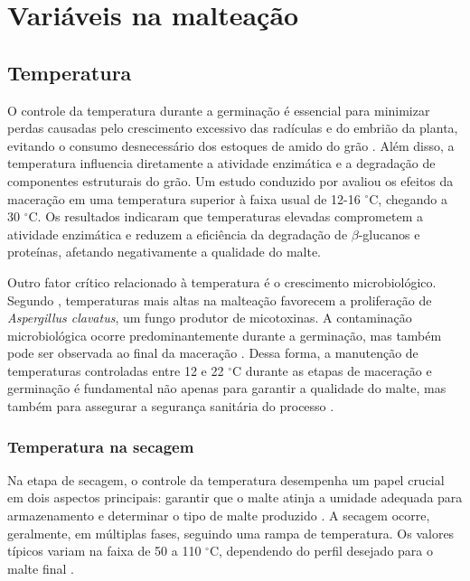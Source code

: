 \section{Variáveis na malteação}

\subsection{Temperatura}

O controle da temperatura durante a germinação é essencial para minimizar perdas causadas pelo crescimento excessivo das radículas e do embrião da planta, evitando o consumo desnecessário dos estoques de amido do grão \cite{PITZ1990, MALLETT2022}. Além disso, a temperatura influencia diretamente a atividade enzimática e a degradação de componentes estruturais do grão. Um estudo conduzido por  avaliou os efeitos da maceração em uma temperatura superior à faixa usual de 12-16 $^{\circ}$C, chegando a 30 $^{\circ}$C. Os resultados indicaram que temperaturas elevadas comprometem a atividade enzimática e reduzem a eficiência da degradação de $\beta$-glucanos e proteínas, afetando negativamente a qualidade do malte.

Outro fator crítico relacionado à temperatura é o crescimento microbiológico. Segundo , temperaturas mais altas na malteação favorecem a proliferação de \textit{Aspergillus clavatus}, um fungo produtor de micotoxinas. A contaminação microbiológica ocorre predominantemente durante a germinação, mas também pode ser observada ao final da maceração \cite{PETTERS1988}. Dessa forma, a manutenção de temperaturas controladas entre 12 e 22 $^{\circ}$C durante as etapas de maceração e germinação é fundamental não apenas para garantir a qualidade do malte, mas também para assegurar a segurança sanitária do processo \cite{TANGNI2002}.

\subsubsection{Temperatura na secagem}

Na etapa de secagem, o controle da temperatura desempenha um papel crucial em dois aspectos principais: garantir que o malte atinja a umidade adequada para armazenamento e determinar o tipo de malte produzido \cite{KUNZE1996}. A secagem ocorre, geralmente, em múltiplas fases, seguindo uma rampa de temperatura. Os valores típicos variam na faixa de 50 a 110 $^{\circ}$C, dependendo do perfil desejado para o malte final \cite{LEWIS2012}.

